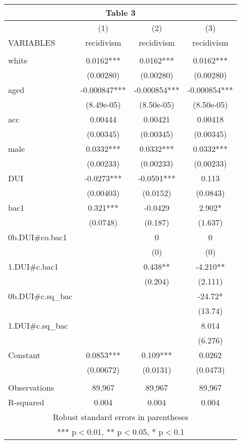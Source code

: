 \documentclass[]{article}
\begin{document}
\begin{tabular}{lccc}
\multicolumn{4}{c}{Table 3} \\ \hline
 & (1) & (2) & (3) \\
VARIABLES & recidivism & recidivism & recidivism \\ \hline
 &  &  &  \\
white & 0.0162*** & 0.0162*** & 0.0162*** \\
 & (0.00280) & (0.00280) & (0.00280) \\
aged & -0.000847*** & -0.000854*** & -0.000854*** \\
 & (8.49e-05) & (8.50e-05) & (8.50e-05) \\
acc & 0.00444 & 0.00421 & 0.00418 \\
 & (0.00345) & (0.00345) & (0.00345) \\
male & 0.0332*** & 0.0332*** & 0.0332*** \\
 & (0.00233) & (0.00233) & (0.00233) \\
DUI & -0.0273*** & -0.0591*** & 0.113 \\
 & (0.00403) & (0.0152) & (0.0843) \\
bac1 & 0.321*** & -0.0429 & 2.902* \\
 & (0.0748) & (0.187) & (1.637) \\
0b.DUI\#co.bac1 &  & 0 & 0 \\
 &  & (0) & (0) \\
1.DUI\#c.bac1 &  & 0.438** & -4.210** \\
 &  & (0.204) & (2.111) \\
0b.DUI\#c.sq\_bac &  &  & -24.72* \\
 &  &  & (13.74) \\
1.DUI\#c.sq\_bac &  &  & 8.014 \\
 &  &  & (6.276) \\
Constant & 0.0853*** & 0.109*** & 0.0262 \\
 & (0.00672) & (0.0131) & (0.0473) \\
 &  &  &  \\
Observations & 89,967 & 89,967 & 89,967 \\
 R-squared & 0.004 & 0.004 & 0.004 \\ \hline
\multicolumn{4}{c}{ Robust standard errors in parentheses} \\
\multicolumn{4}{c}{ *** p$<$0.01, ** p$<$0.05, * p$<$0.1} \\
\end{tabular}
\end{document}
